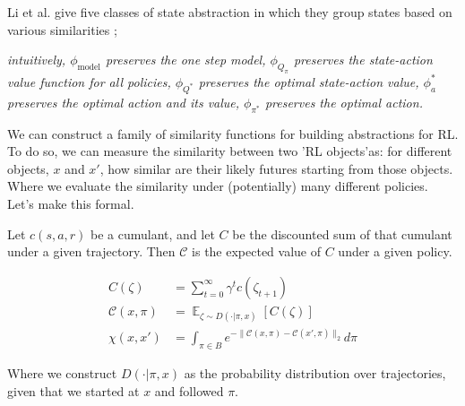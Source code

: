 Li et al. \cite{Littman2006} give five classes of state abstraction in which they group states based on various similarities \footnotemark;

\textit{intuitively,
$\phi_{\text{model}}$ preserves the one step model,
$\phi_{Q_{\pi}}$ preserves the state-action value function for all policies,
$\phi_{Q^{* }}$ preserves the optimal state-action value,
$\phi_a^{* }$ preserves the optimal action and its value,
$\phi_{\pi^{* }}$ preserves the optimal action.}

\vspace{5mm}

We can construct a family of similarity functions for building abstractions for RL. To do so, we can measure the
similarity between two 'RL objects'\footnotemark as: for  different objects, $x$ and $x'$,
how similar are their likely futures starting from those objects. Where we evaluate the similarity under (potentially) many different policies.
Let's make this formal.


Let $c(s, a, r)$ be a cumulant, and let $C$ be the discounted sum of that cumulant under a given trajectory\footnotemark.
Then $\mathcal C$ is the expected value of $C$ under a given policy.


\begin{align*}
C(\zeta) &= \sum_{t=0}^{\infty} \gamma^{t}  c(\zeta_{t+1}) \\
\mathcal C(x, \pi) &= \mathop{\mathbb E}_{\zeta \sim D(\cdot | \pi, x)} [C(\zeta)] \\
\chi(x, x') &= \int_{\pi \in B} e^{-\parallel \mathcal C(x, \pi) - \mathcal C(x', \pi) \parallel_{2}} d\pi \label{eq:family}
\end{align*}

Where we construct $D(\cdot | \pi, x)$ as the probability distribution over trajectories, given that we started at $x$ and followed $\pi$.

